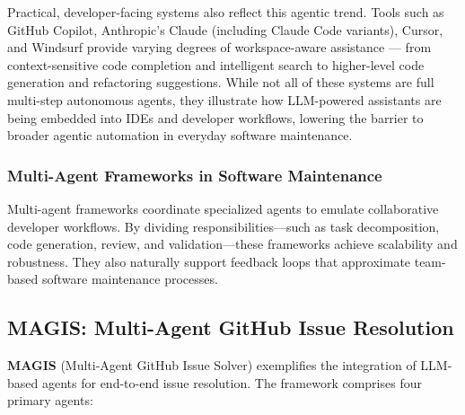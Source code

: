 Practical, developer-facing systems also reflect this agentic trend. Tools such as GitHub Copilot, Anthropic's Claude (including Claude Code variants), Cursor, and Windsurf provide varying degrees of workspace-aware assistance — from context-sensitive code completion and intelligent search to higher-level code generation and refactoring suggestions. While not all of these systems are full multi-step autonomous agents, they illustrate how LLM-powered assistants are being embedded into IDEs and developer workflows, lowering the barrier to broader agentic automation in everyday software maintenance.

\subsubsection*{Multi-Agent Frameworks in Software Maintenance}
Multi-agent frameworks coordinate specialized agents to emulate collaborative developer workflows. By dividing responsibilities—such as task decomposition, code generation, review, and validation—these frameworks achieve scalability and robustness. They also naturally support feedback loops that approximate team-based software maintenance processes.

\subsection{MAGIS: Multi-Agent GitHub Issue Resolution}
\textbf{MAGIS} (Multi-Agent GitHub Issue Solver) exemplifies the integration of LLM-based agents for end-to-end issue resolution. The framework comprises four primary agents:

